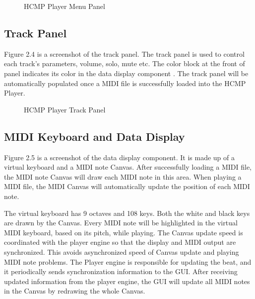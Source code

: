 \begin{figure}[H]
\caption{HCMP Player Menu Panel}
\end{figure}

\subsection{Track Panel}

Figure 2.4 is a screenshot of the track panel. The track panel is used to 
control each track's parameters, volume, solo, mute etc. The color
block at the front of panel indicates its color in the data display component . The 
track panel will be automatically populated once a MIDI file is successfully 
loaded into the HCMP Player.
\begin{figure}[H]
\caption{HCMP Player Track Panel}
\end{figure}

\subsection{MIDI Keyboard and Data Display}
Figure 2.5 is a screenshot of the data display component. It is made up of a virtual  
keyboard and a MIDI note Canvas. After successfully loading a MIDI file, the MIDI 
note Canvas will 
draw each MIDI note in this area. When playing a MIDI file, the MIDI Canvas will 
automatically update the position of each MIDI note. 

The virtual keyboard has 9 octaves and 108 keys. Both the white and black keys 
are drawn by the Canvas. Every MIDI note will be highlighted in the 
virtual MIDI keyboard, based on its pitch, while playing. The Canvas update speed is 
coordinated with the player engine so that the display and MIDI 
output are synchronized. This avoids asynchronized speed 
of Canvas update and playing MIDI note problems. The Player engine is responsible for 
updating the beat, and it 
periodically sends synchronization information to the GUI. After receiving updated 
information from the player engine, the GUI will update all MIDI notes in the Canvas by 
redrawing the whole Canvas.


